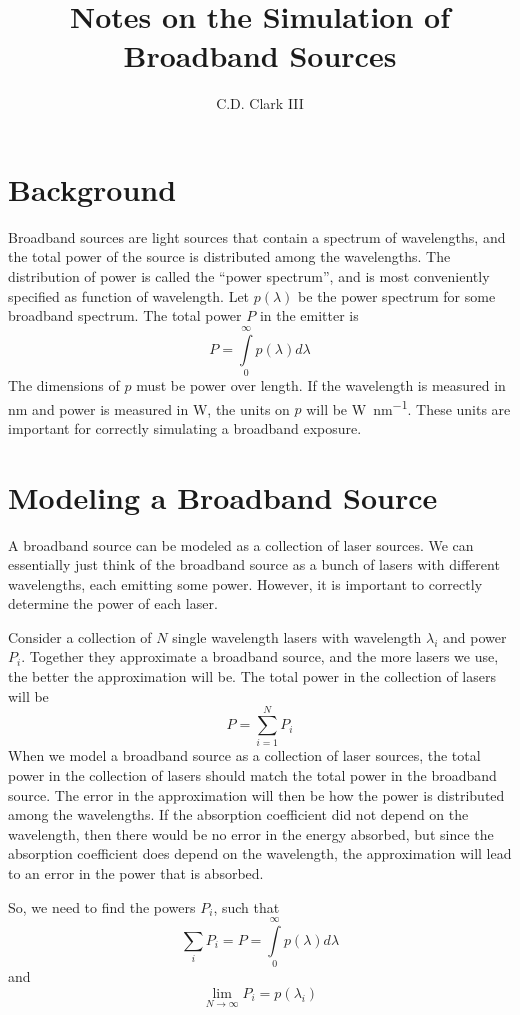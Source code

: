 \documentclass[letterpaper,10pt]{article}
\title{Notes on the Simulation of Broadband Sources}
\author{C.D. Clark III}
\begin{document}
\section{Background}
Broadband sources are light sources that contain a spectrum of wavelengths, and the total power of the source is distributed among the wavelengths. The distribution of power is called the ``power spectrum'',
and is most conveniently specified as function of wavelength. Let $p(\lambda)$ be the power spectrum for some broadband spectrum. The total power $P$ in the emitter is
\begin{equation}
  \label{eq:power_int}
  P = \int\limits_{0}^{\infty} p(\lambda) d\lambda
\end{equation}
The dimensions of $p$ must be power over length. If the wavelength is measured in \si{\nano\meter} and power is measured in \si{\watt}, the units
on $p$ will be \si{\watt\per\nano\meter}. These units are important for correctly simulating a broadband exposure.

\section{Modeling a Broadband Source}
A broadband source can be modeled as a collection of laser sources. We can essentially just think of the broadband source
as a bunch of lasers with different wavelengths, each emitting some power. However, it is important to correctly determine the power
of each laser.

Consider a collection of $N$ single wavelength lasers with wavelength $\lambda_i$ and power $P_i$. Together they approximate a broadband source, and
the more lasers we use, the better the approximation will be. The total power in the collection of lasers will be
\begin{equation}
  \label{eq:power_sum}
  P = \sum_{i=1}^N P_i
\end{equation}
When we model a broadband source as a collection of laser sources, the total power in the collection of lasers should match the total power
in the broadband source. The error in the approximation will then be how the power is distributed among the wavelengths. If the absorption coefficient
did not depend on the wavelength, then there would be no error in the energy absorbed, but since the absorption coefficient does depend on the wavelength,
the approximation will lead to an error in the power that is absorbed.

So, we need to find the powers $P_i$, such that
\begin{equation}
  \sum_i P_i = P = \int\limits_{0}^{\infty} p(\lambda) d\lambda
\end{equation}
and
\begin{equation}
  \lim_{N\rightarrow\infty} P_i = p(\lambda_i)
\end{equation}
\end{document}
